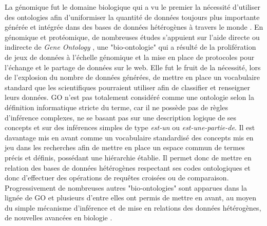 La génomique fut le domaine biologique qui a vu le premier la nécessité d'utiliser des ontologies afin d'uniformiser la quantité de données toujours plus importante générée et intégrée dans des bases de données hétérogènes à travers le monde \cite{schuurman_ontologies_2008}.
En génomique et protéomique, de nombreuses études s'appuient sur l'aide directe ou indirecte de \textit{Gene Ontology} \cite{ashburner_gene_2000}, une "bio-ontologie" qui a résulté de la prolifération de jeux de données à l'échelle génomique et la mise en place de protocoles pour l'échange et le partage de données sur le web. Elle fut le fruit de la nécessité, lors de l'explosion du nombre de données générées, de mettre en place un vocabulaire standard que les scientifiques pourraient utiliser afin de classifier et renseigner leurs données. GO n'est pas totalement considéré comme une ontologie selon la définition informatique stricte du terme, car il ne possède pas de règles d'inférence complexes, ne se basant pas sur une description logique de ses concepts et sur des inférences simples de type \textit{est-un} ou \textit{est-une-partie-de}. Il est davantage mis en avant comme un vocabulaire standardisé des concepts mis en jeu dans les recherches afin de mettre en place un espace commun de termes précis et définis, possédant une hiérarchie établie. Il permet donc de mettre en relation des bases de données hétérogènes respectant ses codes ontologiques et donc d'effectuer des opérations de requêtes croisées ou de comparaison. Progressivement de nombreuses autres "bio-ontologies" sont apparues dans la lignée de GO et plusieurs d'entre elles ont permis de mettre en avant, au moyen du simple mécanisme d'inférence et de mise en relations des données hétérogènes, de nouvelles avancées en biologie \cite{yoshikawa_drug_2004, stenzhorn_biotop_2008, smith_obo_2007}.

